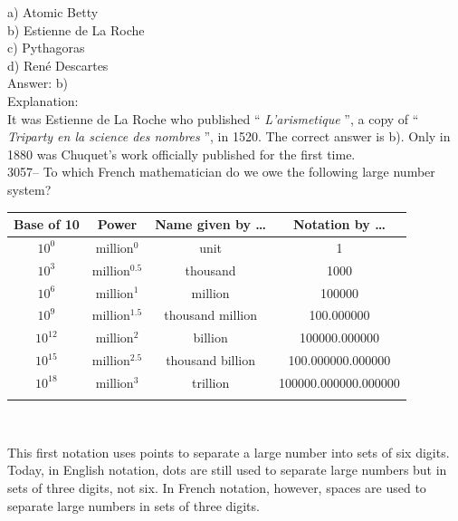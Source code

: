 \documentclass[letterpaper, 12pt]{article}
\begin{document}
a) Atomic Betty\\
b) Estienne de La Roche\\
c) Pythagoras\\
d) Ren\'e Descartes\\

Answer: b)\\

Explanation:\\
It was Estienne de La Roche who published `` \emph{L'arismetique} '', a copy of `` \emph{Triparty en la science des nombres} '', in 1520. The correct answer is b). Only in 1880 was Chuquet's work officially published for the first time.\\



3057-- To which French mathematician do we owe the following large number system?\\
\begin{center}
\begin{tabular}{|c|c|c|c|} \hline
{\bf Base of 10} & {\bf Power} & {\bf Name given by \dots} & {\bf Notation by \dots} \\ \hline \hline
$10^{0}$ & million$^{0}$ & unit & 1\\[1mm] \hline
$10^{3}$ & million$^{0.5}$ & thousand & 1000\\[1mm] \hline
$10^{6}$ & million$^{1}$ & million & 100000\\[1mm] \hline
$10^{9}$ & million$^{1.5}$ & thousand million & 100.000000\\[1mm] \hline
$10^{12}$ & million$^{2}$ & billion & 100000.000000\\[1mm] \hline
$10^{15}$ & million$^{2.5}$ & thousand billion & 100.000000.000000\\[1mm] \hline
$10^{18}$ & million$^{3}$ & trillion & 100000.000000.000000\\[1mm] \hline
\multicolumn{4}{c}{}\\
\end{tabular}\\
\end{center}
This first notation uses points to separate a large number into sets of six digits. Today, in English notation, dots are still used to separate large numbers but in sets of three digits, not six. In French notation, however, spaces are used to separate large numbers in sets of three digits.\\
\end{document}
